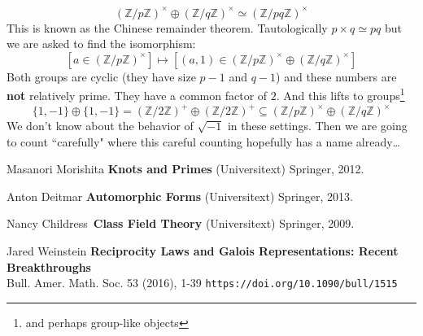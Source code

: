 \documentclass[12pt]{article}
\begin{document}
$$ (\mathbb{Z}/p\mathbb{Z})^\times \oplus (\mathbb{Z}/q\mathbb{Z})^\times \simeq (\mathbb{Z}/pq\mathbb{Z})^\times$$
This is known as the {\color{blue!50!green} Chinese remainder theorem}. Tautologically $p \times q \simeq pq$  but we are asked to find the isomorphism:
$$  \left[ a \in (\mathbb{Z}/p\mathbb{Z})^\times \right]
 \mapsto \left[ (a,1) \in (\mathbb{Z}/p\mathbb{Z})^\times \oplus (\mathbb{Z}/q\mathbb{Z})^\times \right]$$
Both groups are cyclic (they have size $p-1$ and $q-1$) and these numbers are \textbf{not} relatively prime.  They have a common factor of $2$.  And this lifts to groups\footnote{and perhaps group-like objects}
$$ \{ 1, -1 \} \oplus \{ 1, -1\} =
(\mathbb{Z}/2\mathbb{Z})^+ \oplus (\mathbb{Z}/2\mathbb{Z})^+
\subseteq
(\mathbb{Z}/p\mathbb{Z})^\times \oplus (\mathbb{Z}/q\mathbb{Z})^\times
 $$
We don't know about the behavior of $\sqrt{-1}$ in these settings.  Then we are going to count ``carefully" where this careful counting hopefully has a name already\dots 


\vfill

\begin{thebibliography}{}

\item Masanori Morishita \textbf{Knots and Primes} (Universitext) Springer, 2012.

\item Anton Deitmar\;\;\; \textbf{Automorphic Forms} (Universitext) Springer, 2013.

\item Nancy Childress \;\;\;\,\textbf{Class Field Theory} (Universitext) Springer, 2009.

\item  Jared Weinstein \textbf{Reciprocity Laws and Galois Representations: Recent Breakthroughs} \\ 
Bull. Amer. Math. Soc. 53 (2016), 1-39 \hfill \texttt{https://doi.org/10.1090/bull/1515} 

\end{thebibliography}
\end{document}
